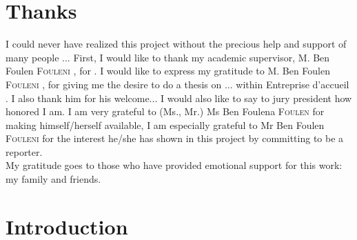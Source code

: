 \documentclass[a4paper, oneside, french, 12pt, final]{extreport}
\newcommand{\studyDepartment} {%
  Entreprise d'accueil %
}
\newcommand{\juryMemberOne} {%
  Ms Ben Foulena \textsc{Foulen}%
}
\newcommand{\juryMemberTwo} {%
  Mr Ben Foulen \textsc{Fouleni}%
}
\newcommand{\juryMemberThree} {%
	M. Ben Foulen \textsc{Fouleni}%
}
\newcommand{\juryMemberFour} {%
	M. Ben Foulen \textsc{Fouleni}%
}
\begin{document}
\chapter*{Thanks}
\thispagestyle{empty}

I could never have realized this project without the precious help and support of many people ... First, I would like to thank my academic supervisor, \juryMemberFour{}, for . I would like to express my gratitude to \juryMemberThree{}, for giving me the desire to do a thesis on ... within \studyDepartment. I also thank him for his welcome... I would also like to say to jury president how honored I am. I am very grateful to (Ms., Mr.) \juryMemberOne{} for making himself/herself available, I am especially grateful to \juryMemberTwo{} for the interest he/she has shown in this project by committing to be a reporter. \\

My gratitude goes to those who have provided emotional support for this work: my family and friends. 

\tableofcontents
{}
\cleardoublepage%

\listoffigures
\cleardoublepage%

\listoftables
\cleardoublepage

\listofalgorithms
{}
\cleardoublepage
    








\chapter*{Introduction}
\label{chap:general_intorduction}
%
\end{document}
